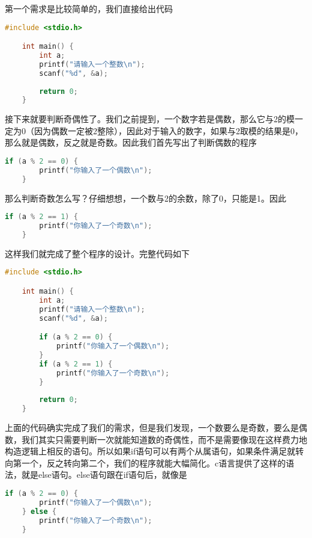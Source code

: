 第一个需求是比较简单的，我们直接给出代码

\begin{lstlisting}[language=C]
    #include <stdio.h>

    int main() {
        int a;
        printf("请输入一个整数\n");
        scanf("%d", &a);
        
        return 0;
    }
\end{lstlisting}

接下来就要判断奇偶性了。我们之前提到，一个数字若是偶数，那么它与2的模一定为0（因为偶数一定被2整除），因此对于输入的数字，如果与2取模的结果是0，那么就是偶数，反之就是奇数。因此我们首先写出了判断偶数的程序

\begin{lstlisting}[language=C]
    if (a % 2 == 0) {
        printf("你输入了一个偶数\n");
    }
\end{lstlisting}

那么判断奇数怎么写？仔细想想，一个数与2的余数，除了0，只能是1。因此

\begin{lstlisting}[language=C]
    if (a % 2 == 1) {
        printf("你输入了一个奇数\n");
    }
\end{lstlisting}

这样我们就完成了整个程序的设计。完整代码如下

\begin{lstlisting}[language=C]
    #include <stdio.h>

    int main() {
        int a;
        printf("请输入一个整数\n");
        scanf("%d", &a);

        if (a % 2 == 0) {
            printf("你输入了一个偶数\n");
        }
        if (a % 2 == 1) {
            printf("你输入了一个奇数\n");
        }
        
        return 0;
    }
\end{lstlisting}

上面的代码确实完成了我们的需求，但是我们发现，一个数要么是奇数，要么是偶数，我们其实只需要判断一次就能知道数的奇偶性，而不是需要像现在这样费力地构造逻辑上相反的语句。所以如果if语句可以有两个从属语句，如果条件满足就转向第一个，反之转向第二个，我们的程序就能大幅简化。c语言提供了这样的语法，就是else语句。else语句跟在if语句后，就像是

\begin{lstlisting}[language=C]
    if (a % 2 == 0) {
        printf("你输入了一个偶数\n");
    } else {
        printf("你输入了一个奇数\n");
    }
\end{lstlisting}

